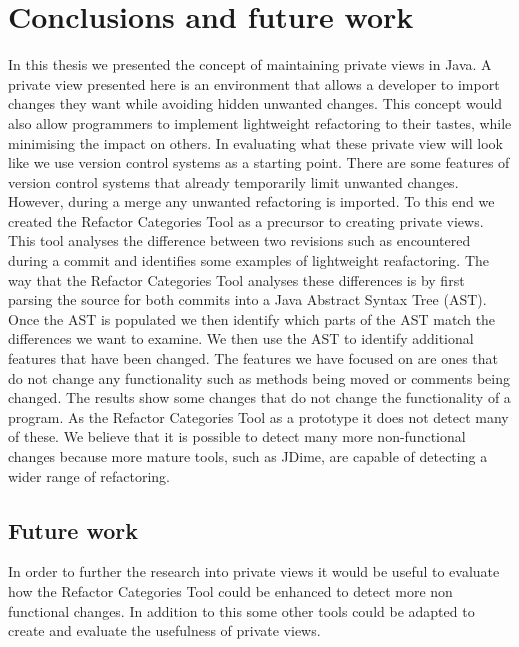 
\chapter{Conclusions and future work}\label{C:con}

In this thesis we presented the concept of maintaining private views in Java.
A private view presented here is an environment that allows a developer to import changes they want while avoiding hidden unwanted changes. 
This concept would also allow programmers to implement lightweight refactoring to their tastes, while minimising the impact on others.  
In evaluating what these private view will look like we use version control systems as a starting point.
There are some features of version control systems that already temporarily limit unwanted changes.
However, during a merge any unwanted refactoring is imported. 
To this end we created the Refactor Categories Tool as a precursor to creating private views. 
This tool analyses the difference between two revisions such as encountered during a commit and identifies some examples of lightweight reafactoring.
The way that the Refactor Categories Tool analyses these differences is by first parsing the source for both commits into a Java Abstract Syntax Tree (AST).
Once the AST is populated we then identify which parts of the AST match the differences we want to examine.
We then use the AST to identify additional features that have been changed. 
The features we have focused on are ones that do not change any functionality such as methods being moved or comments being changed. 
The results show some changes that do not change the functionality of a program.
As the Refactor Categories Tool as a prototype it does not detect many of these.
We believe that it is possible to detect many more non-functional changes because more mature tools, such as JDime, are capable of detecting a wider range of refactoring. 


\section{Future work}

In order to further the research into private views it would be useful to evaluate how the Refactor Categories Tool could be enhanced to detect more non functional changes. 
In addition to this some other tools could be adapted to create and evaluate the usefulness of private views.  
